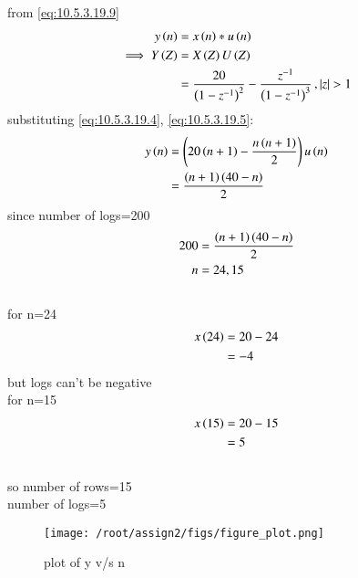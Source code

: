 \documentclass[journal,12pt,twocolumn]{IEEEtran}
\theoremstyle{remark}
\begin{document}
from \eqref{eq:10.5.3.19.9}
\begin{align}
y\left(n\right)&=x\left(n\right)*u\left(n\right)
\\\implies Y\left(Z\right)&=X\left(Z\right)U\left(Z\right)
\\&=\frac{20}{\left(1-z^{-1}\right)^2}-\frac{z^{-1}}{\left(1-z^{-1}\right)^3}\,,\left\vert z\right\vert>1
\end{align}
substituting \eqref{eq:10.5.3.19.4}, \eqref{eq:10.5.3.19.5}:
\begin{align}
y\left(n\right)&=\left(20\left(n+1\right)-\frac{n\left(n+1\right)}{2}\right)u\left(n\right)
\\&=\frac{\left(n+1\right)\left(40-n\right)}{2}
\end{align}
since number of logs=200
\begin{align}
 200&=\frac{\left(n+1\right)\left(40-n\right)}{2}   
\\n&=24,15
\end{align}
\\for n=24
\begin{align}
x\left(24\right)&=20-24
\\&={-4}
\end{align}
but logs can't be negative
\\for n=15
\begin{align}
x\left(15\right)&=20-15
\\&=5
\end{align}
\\so number of rows=15
\\number of logs=5
\\\begin{figure}[h]
  \renewcommand\thefigure{1}
    \centering
    \texttt{[image: /root/assign2/figs/figure\_plot.png]}
    \caption{plot of y v/s n}
\end{figure}
\end{document}
